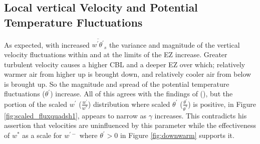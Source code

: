 
\subsection{Local vertical Velocity and Potential Temperature Fluctuations}

As expected, with increased $\overline{w^{'}\theta^{'}}_{s}$ the variance and magnitude of the vertical velocity fluctuations within and at the limits of the \acs{EZ} increase.  Greater turbulent velocity causes a higher \acs{CBL} and a deeper \acs{EZ} over which; relatively warmer air from higher up is brought down, and relatively cooler air from below is brought up.  So the magnitude and spread of the potential temperature fluctuations ($\theta^{'}$) increase. All of this agrees with the findings of \citeauthor{Sorbjan} (\citeyear{Sorbjan}), but the portion of the scaled $w^{'}$ ($\frac{w^{'}}{w^{*}}$) distribution where scaled $\theta^{'}$ ($\frac{\theta^{'}}{\theta^{*}}$) is positive, in Figure \ref{fig:scaled_fluxquadsh1}, appears to narrow as $\gamma$ increases. This contradicts his assertion that velocities are uninfluenced by this parameter while the effectiveness of $w^{*}$ as a scale for $w^{'-}$ where $\theta^{'}>0$ in Figure \ref{fig:downwarm} supports it.\\

